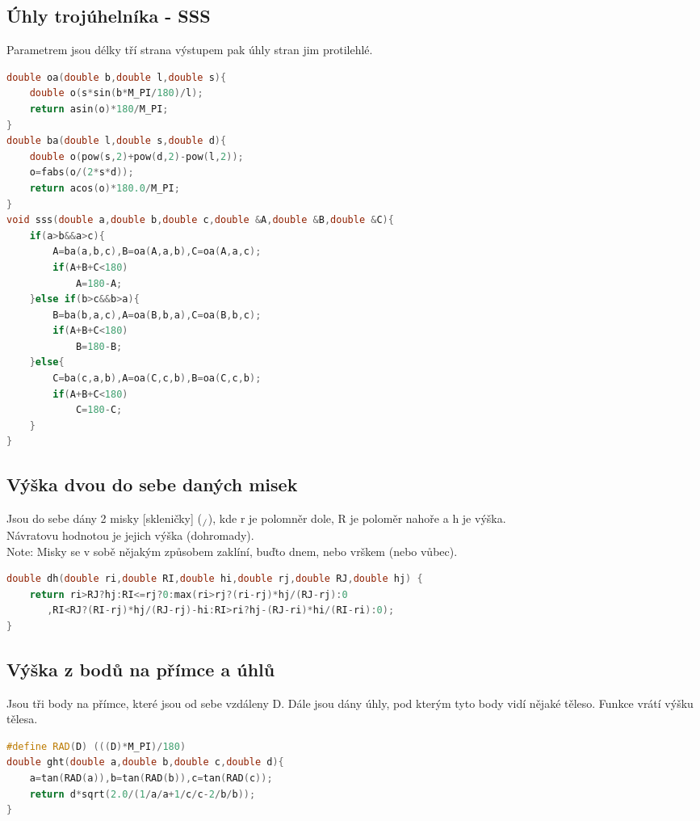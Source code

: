\documentclass[11pt]{article}
\begin{document}
\subsection{Úhly trojúhelníka - SSS}
Parametrem jsou délky tří strana výstupem pak úhly stran jim protilehlé.
\begin{lstlisting}[language=C++]
double oa(double b,double l,double s){
    double o(s*sin(b*M_PI/180)/l);
    return asin(o)*180/M_PI;
}
double ba(double l,double s,double d){
    double o(pow(s,2)+pow(d,2)-pow(l,2));
    o=fabs(o/(2*s*d));
    return acos(o)*180.0/M_PI;
}
void sss(double a,double b,double c,double &A,double &B,double &C){
    if(a>b&&a>c){
        A=ba(a,b,c),B=oa(A,a,b),C=oa(A,a,c);
        if(A+B+C<180)
            A=180-A;
    }else if(b>c&&b>a){
        B=ba(b,a,c),A=oa(B,b,a),C=oa(B,b,c);
        if(A+B+C<180)
            B=180-B;
    }else{
        C=ba(c,a,b),A=oa(C,c,b),B=oa(C,c,b);
        if(A+B+C<180)
            C=180-C;
    }
}
\end{lstlisting}
\subsection{Výška dvou do sebe daných misek}
Jsou do sebe dány 2 misky [skleničky] ($\\_/$), kde \textsf{r} je polomněr dole, \textsf{R} je poloměr nahoře a \textsf{h} je výška.
\\Návratovu hodnotou je jejich výška (dohromady).
\\Note: Misky se v sobě nějakým způsobem zaklíní, buďto dnem, nebo vrškem (nebo vůbec).
\begin{lstlisting}[language=C++]
double dh(double ri,double RI,double hi,double rj,double RJ,double hj) {
    return ri>RJ?hj:RI<=rj?0:max(ri>rj?(ri-rj)*hj/(RJ-rj):0
       ,RI<RJ?(RI-rj)*hj/(RJ-rj)-hi:RI>ri?hj-(RJ-ri)*hi/(RI-ri):0);
}
\end{lstlisting}
\subsection{Výška z bodů na přímce a úhlů}
Jsou tři body na přímce, které jsou od sebe vzdáleny \textsf{D}. Dále jsou dány úhly, pod kterým tyto body vidí nějaké těleso. Funkce vrátí výšku tělesa.
\begin{lstlisting}[language=C++]
#define RAD(D) (((D)*M_PI)/180)
double ght(double a,double b,double c,double d){
    a=tan(RAD(a)),b=tan(RAD(b)),c=tan(RAD(c));
    return d*sqrt(2.0/(1/a/a+1/c/c-2/b/b));
}
\end{lstlisting}
\end{document}
